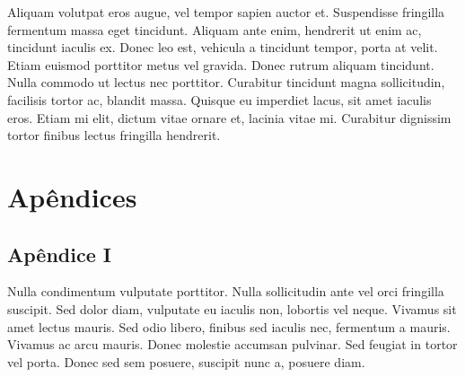 \documentclass[book,A4paper,10pt,twoside,oldfontcommands]{memoir}\usepackage[]{graphicx}\usepackage[usenames,dvipsnames]{color}
\begin{document}
Aliquam volutpat eros augue, vel tempor sapien auctor et. Suspendisse
fringilla fermentum massa eget tincidunt. Aliquam ante enim, hendrerit
ut enim ac, tincidunt iaculis ex. Donec leo est, vehicula a tincidunt
tempor, porta at velit. Etiam euismod porttitor metus vel gravida.
Donec rutrum aliquam tincidunt. Nulla commodo ut lectus nec porttitor.
Curabitur tincidunt magna sollicitudin, facilisis tortor ac, blandit
massa. Quisque eu imperdiet lacus, sit amet iaculis eros. Etiam mi
elit, dictum vitae ornare et, lacinia vitae mi. Curabitur dignissim
tortor finibus lectus fringilla hendrerit.


\renewcommand\bibname{Referências} %
\clearpage



\chapter*{Apêndices}
\renewcommand{\thefigure}{A.\arabic{figure}}
\renewcommand{\thetable}{A.\arabic{table}}



\section*{Apêndice I}

Nulla condimentum vulputate porttitor. Nulla sollicitudin ante vel
orci fringilla suscipit. Sed dolor diam, vulputate eu iaculis non,
lobortis vel neque. Vivamus sit amet lectus mauris. Sed odio libero,
finibus sed iaculis nec, fermentum a mauris. Vivamus ac arcu mauris.
Donec molestie accumsan pulvinar. Sed feugiat in tortor vel porta.
Donec sed sem posuere, suscipit nunc a, posuere diam.
\end{document}
